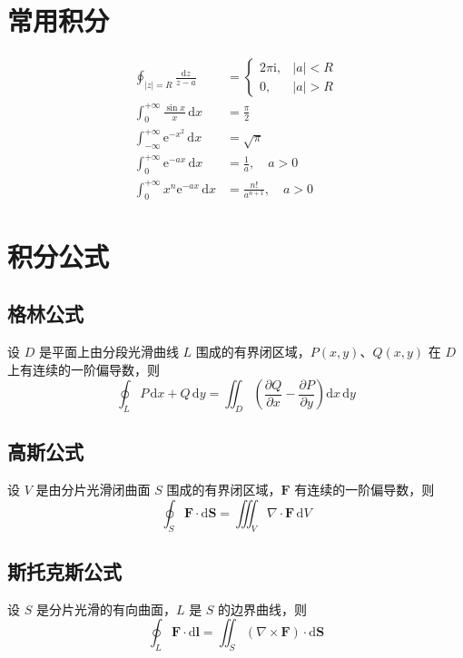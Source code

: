 \section{常用积分}
\begin{align}
    \oint_{|z|=R} \frac{\mathrm{d}z}{z - a} &= \begin{cases} 2\pi\mathrm{i}, & |a| < R \\ 0, & |a| > R \end{cases} \\
    \int_0^{+\infty} \frac{\sin x}{x}\,\mathrm{d}x &= \frac{\pi}{2} \\
    \int_{-\infty}^{+\infty} \mathrm{e}^{-x^2}\,\mathrm{d}x &= \sqrt{\pi} \\
    \int_0^{+\infty} \mathrm{e}^{-ax}\,\mathrm{d}x &= \frac{1}{a}, \quad a > 0 \\
    \int_0^{+\infty} x^n\mathrm{e}^{-ax}\,\mathrm{d}x &= \frac{n!}{a^{n+1}}, \quad a > 0
\end{align}

\section{积分公式}

\subsection{格林公式}
\begin{zhongyao}[格林公式]
设 $D$ 是平面上由分段光滑曲线 $L$ 围成的有界闭区域，$P(x,y)$、$Q(x,y)$ 在 $D$ 上有连续的一阶偏导数，则
\[
    \oint_L P\,\mathrm{d}x + Q\,\mathrm{d}y = \iint_D \left(\frac{\partial Q}{\partial x} - \frac{\partial P}{\partial y}\right)\mathrm{d}x\,\mathrm{d}y
\]
\end{zhongyao}

\subsection{高斯公式}
\begin{zhongyao}[高斯公式]
设 $V$ 是由分片光滑闭曲面 $S$ 围成的有界闭区域，$\boldsymbol{F}$ 有连续的一阶偏导数，则
\[
    \oint_S \boldsymbol{F} \cdot \mathrm{d}\boldsymbol{S} = \iiint_V \nabla \cdot \boldsymbol{F} \, \mathrm{d}V
\]
\end{zhongyao}

\subsection{斯托克斯公式}
\begin{zhongyao}[斯托克斯公式]
设 $S$ 是分片光滑的有向曲面，$L$ 是 $S$ 的边界曲线，则
\[
    \oint_L \boldsymbol{F} \cdot \mathrm{d}\boldsymbol{l} = \iint_S (\nabla \times \boldsymbol{F}) \cdot \mathrm{d}\boldsymbol{S}
\]
\end{zhongyao}

